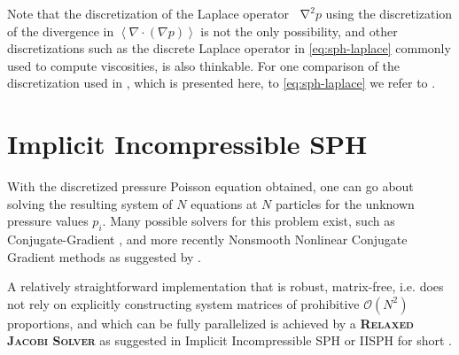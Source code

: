 \documentclass[oneside, a4paper]{book}
\newcommand\emphasis[1]{{\scshape\bfseries#1}}
\newcommand\angled[1]{\left\langle#1\right\rangle}
\newcommand*\Laplace{\mathop{}\!\mathbin\nabla^2}
\newcommand\br[1]{\left(#1\right)}
\newcommand\divergence{{\nabla\cdot}}
\begin{document}
    Note that the discretization of the Laplace operator $\Laplace p$ using the discretization of the divergence in $\angled{\divergence\br{\nabla p}}$ is not the only possibility, and other discretizations such as the discrete Laplace operator in \autoref{eq:sph-laplace} commonly used to compute viscosities, is also thinkable. For one comparison of the discretization used in \autocite[Implicit Incompressible SPH]{iisph}, which is presented here, to \autoref{eq:sph-laplace} we refer to \autocite[Fürstenau et al.]{fuerstenau-laplace-discretization-comparison}.
    
    \section{Implicit Incompressible SPH}\label{sec:iisph}
    With the discretized pressure Poisson equation obtained, one can go about solving the resulting system of $N$ equations at $N$ particles for the unknown pressure values $p_i$. Many possible solvers for this problem exist, such as Conjugate-Gradient \autocite[as alternatively proposed by Ihmsen et al.]{iisph}, and more recently Nonsmooth Nonlinear Conjugate Gradient methods as suggested by \autocite[Probst and Teschner]{monolithic-rigids-timo}.

    A relatively straightforward implementation that is robust, matrix-free, i.e. does not rely on explicitly constructing system matrices of prohibitive $\mathcal{O}\br{N^2}$ proportions, and which can be fully parallelized is achieved by a \emphasis{Relaxed Jacobi Solver} as suggested in Implicit Incompressible SPH or IISPH for short \autocite[by Ihmsen et al.]{iisph}. 
\end{document}
